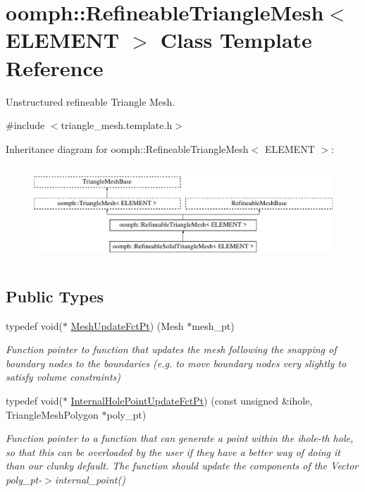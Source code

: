\hypertarget{classoomph_1_1RefineableTriangleMesh}{}\section{oomph\+:\+:Refineable\+Triangle\+Mesh$<$ E\+L\+E\+M\+E\+NT $>$ Class Template Reference}
\label{classoomph_1_1RefineableTriangleMesh}


Unstructured refineable Triangle Mesh.  




{\ttfamily \#include $<$triangle\+\_\+mesh.\+template.\+h$>$}

Inheritance diagram for oomph\+:\+:Refineable\+Triangle\+Mesh$<$ E\+L\+E\+M\+E\+NT $>$\+:\begin{figure}[H]
\begin{center}
\leavevmode
\includegraphics[height=3.612903cm]{classoomph_1_1RefineableTriangleMesh}
\end{center}
\end{figure}
\subsection*{Public Types}
\begin{DoxyCompactItemize}
\item 
typedef void($\ast$ \hyperlink{classoomph_1_1RefineableTriangleMesh_aa78ffa56b66a1371aec25e25f7aaff9e}{Mesh\+Update\+Fct\+Pt}) (Mesh $\ast$mesh\+\_\+pt)
\begin{DoxyCompactList}\small\item\em Function pointer to function that updates the mesh following the snapping of boundary nodes to the boundaries (e.\+g. to move boundary nodes very slightly to satisfy volume constraints) \end{DoxyCompactList}\item 
typedef void($\ast$ \hyperlink{classoomph_1_1RefineableTriangleMesh_aa6831f42aa1941f4ae0b9186d01f9d7c}{Internal\+Hole\+Point\+Update\+Fct\+Pt}) (const unsigned \&ihole, Triangle\+Mesh\+Polygon $\ast$poly\+\_\+pt)
\begin{DoxyCompactList}\small\item\em Function pointer to a function that can generate a point within the ihole-\/th hole, so that this can be overloaded by the user if they have a better way of doing it than our clunky default. The function should update the components of the Vector poly\+\_\+pt-\/$>$internal\+\_\+point() \end{DoxyCompactList}\end{DoxyCompactItemize}
